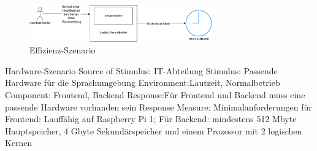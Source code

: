 \begin{figure}[tbh]
  \centering
  \includegraphics[width=0.7\textwidth]{Graphics/Hardware.png}
  \caption{Effizienz-Szenario}
  \label{fig:Qualitaet6}
\end{figure}


Hardware-Szenario
Source of Stimulus: IT-Abteilung
Stimulus: Passende Hardware für die Sprachumgebung
Environment:Lautzeit, Normalbetrieb
Component: Frontend, Backend
Response:Für Frontend und Backend muss eine passende Hardware vorhanden sein
Response Measure: Minimalanforderungen für Frontend: Lauffähig auf Raspberry Pi 1; Für Backend: mindestens 512 Mbyte Hauptspeicher, 4 Gbyte Sekundärspeicher und einem Prozessor mit 2 logischen Kernen


